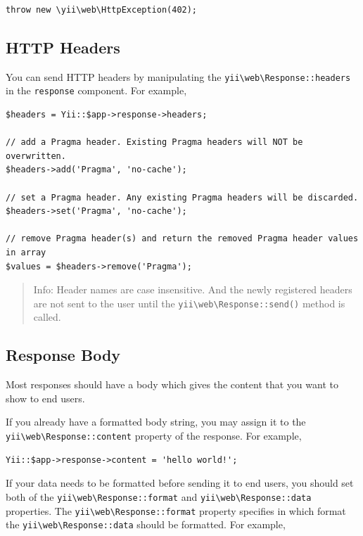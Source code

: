 \lstset{language=php}\begin{lstlisting}
throw new \yii\web\HttpException(402);
\end{lstlisting}
\subsection{HTTP Headers \label{runtime-responses.md::http-headers}}
You can send HTTP headers by manipulating the \texttt{yii{\allowbreak{}\textbackslash}web{\allowbreak{}\textbackslash}Response\allowbreak{}::\allowbreak{}headers} in the \lstinline|response| component.
For example,

\lstset{language=php}\begin{lstlisting}
$headers = Yii::$app->response->headers;

// add a Pragma header. Existing Pragma headers will NOT be overwritten.
$headers->add('Pragma', 'no-cache');

// set a Pragma header. Any existing Pragma headers will be discarded.
$headers->set('Pragma', 'no-cache');

// remove Pragma header(s) and return the removed Pragma header values in array
$values = $headers->remove('Pragma');
\end{lstlisting}
\begin{quote}Info: Header names are case insensitive. And the newly registered headers are not sent to the user until
  the \texttt{yii{\allowbreak{}\textbackslash}web{\allowbreak{}\textbackslash}Response\allowbreak{}::\allowbreak{}send()} method is called.

\end{quote}
\subsection{Response Body \label{runtime-responses.md::response-body}}
Most responses should have a body which gives the content that you want to show to end users.

If you already have a formatted body string, you may assign it to the \texttt{yii{\allowbreak{}\textbackslash}web{\allowbreak{}\textbackslash}Response\allowbreak{}::\allowbreak{}content} property
of the response. For example,

\lstset{language=php}\begin{lstlisting}
Yii::$app->response->content = 'hello world!';
\end{lstlisting}
If your data needs to be formatted before sending it to end users, you should set both of the
\texttt{yii{\allowbreak{}\textbackslash}web{\allowbreak{}\textbackslash}Response\allowbreak{}::\allowbreak{}format} and \texttt{yii{\allowbreak{}\textbackslash}web{\allowbreak{}\textbackslash}Response\allowbreak{}::\allowbreak{}data} properties. The \texttt{yii{\allowbreak{}\textbackslash}web{\allowbreak{}\textbackslash}Response\allowbreak{}::\allowbreak{}format}
property specifies in which format the \texttt{yii{\allowbreak{}\textbackslash}web{\allowbreak{}\textbackslash}Response\allowbreak{}::\allowbreak{}data} should be formatted. For example,

